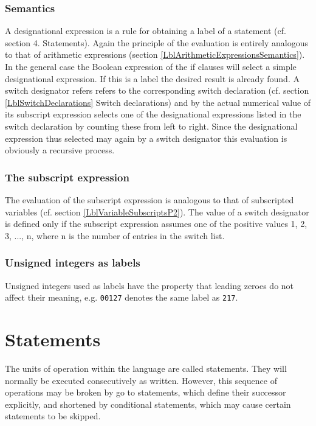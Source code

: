 \documentclass[a4paper,11pt]{article}
\begin{document}
\subsubsection{Semantics}
\label{LblDesignationalExpressionsSemantics}

A designational expression is a rule for obtaining a label of a
statement (cf. section 4.  Statements).  Again the principle of the
evaluation is entirely analogous to that of arithmetic expressions
(section \ref{LblArithmeticExpressionsSemantics}).  In the general
case the Boolean expression of the if clauses will select a simple
designational expression.  If this is a label the desired result is
already found.  A switch designator refers refers to the corresponding
switch declaration (cf. section \ref{LblSwitchDeclarations} Switch
declarations) and by the actual numerical value of its subscript
expression selects one of the designational expressions listed in the
switch declaration by counting these from left to right.  Since the
designational expression thus selected may again by a switch
designator this evaluation is obviously a recursive process.

\subsubsection{The subscript expression}

The evaluation of the subscript expression is analogous to that of
subscripted variables (cf. section \ref{LblVariableSubscriptsP2}).
The value of a switch designator is defined only if the subscript
expression assumes one of the positive values 1, 2, 3, ..., n, where n
is the number of entries in the switch list.

\subsubsection{Unsigned integers as labels}

Unsigned integers used as labels have the property that leading zeroes
do not affect their meaning, e.g. \texttt{00127} denotes the same
label as \texttt{217}.



\section{Statements}
\label{LblStatements}


The units of operation within the language are called statements.
They will normally be executed consecutively as written.  However,
this sequence of operations may be broken by go to statements, which
define their successor explicitly, and shortened by conditional
statements, which may cause certain statements to be skipped.
\end{document}
